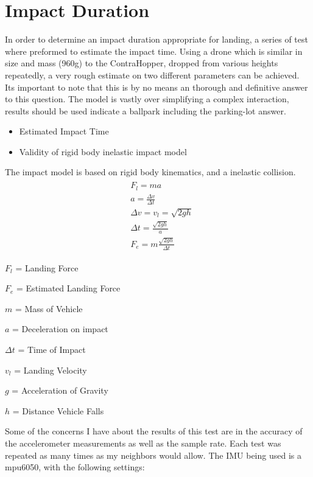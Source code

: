 \documentclass[12pt,letterpaper]{article}
\begin{document}
\section{Impact Duration}

In order to determine an impact duration appropriate for landing, a series of test where preformed to estimate the impact time. Using a drone which is similar in size and mass (960g) to the ContraHopper, dropped from various heights repeatedly, a very rough estimate on two different parameters can be achieved. Its important to note that this is by no means an thorough and definitive answer to this question. The model is vastly over simplifying a complex interaction, results should be used indicate a ballpark including the parking-lot answer. 

\begin{itemize}
    \itemsep -3pt {} 
     \item Estimated Impact Time
    \item Validity of rigid body inelastic impact model
\end{itemize}
The impact model is based on rigid body kinematics, and a inelastic collision.
\begin{gather}
\begin{aligned}
    &F_l = ma 
    \\
    &a = \frac{\Delta v}{\Delta t}
    \\
    &\Delta v = v_l = \sqrt{2gh}
    \\
    &\Delta t = \frac{\sqrt{2gh}}{a}
    \\
    &F_e = m\frac{\sqrt{2gh}}{\Delta t}
\end{aligned}
\end{gather}

\begin{description}
    \item $F_l$ = Landing Force
    \item $F_e$ = Estimated Landing Force
    \item $m$ = Mass of Vehicle 
    \item $a$ = Deceleration on impact  
    \item $\Delta t$ = Time of Impact
    \item $v_l$ = Landing Velocity
    \item $g$ = Acceleration of Gravity
    \item $h$ = Distance Vehicle Falls
\end{description}

Some of the concerns I have about the results of this test are in the accuracy of the accelerometer measurements as well as the sample rate. Each test was repeated as many times as my neighbors would allow. The IMU being used is a mpu6050, with the following settings:
\end{document}
